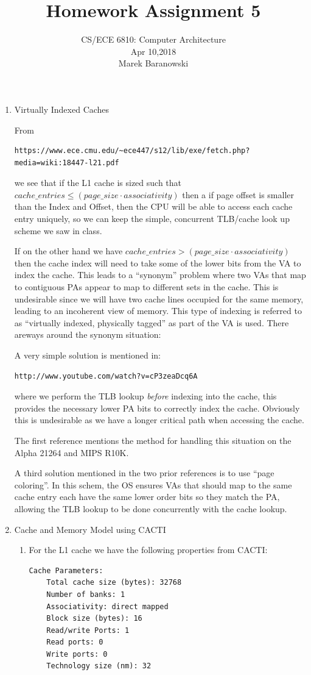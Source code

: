 \documentclass[a4paper, 11pt]{exam}
\title{Homework Assignment 5}
\subtitle{CS/ECE 6810: Computer Architecture \\
Apr 10,2018\\
Marek Baranowski}
\begin{document}
\maketitle
\begin{enumerate}
\item Virtually Indexed Caches

From 
\begin{verbatim}
https://www.ece.cmu.edu/~ece447/s12/lib/exe/fetch.php?media=wiki:18447-l21.pdf
\end{verbatim}
we see that if the L1 cache is sized such that 
$cache\_entries\le(page\_size\cdot associativity)$ then a if page offset is smaller
than the Index and Offset, then the CPU will be able to access each cache
entry uniquely, so we can keep the simple, concurrent TLB/cache look up scheme
we saw in class.

If on the other hand we have $cache\_entries>(page\_size\cdot associativity)$
then the cache index will need to take some of the lower bits from the VA to
index the cache. This leads to a ``synonym'' problem where two VAs that map
to contiguous PAs appear to map to different sets in the cache. This is 
undesirable since we will have two cache lines occupied for the same memory,
leading to an incoherent view of memory. This type of indexing is referred to
as ``virtually indexed, physically tagged'' as part of the VA is used. There 
areways around the synonym situation:

A very simple solution is mentioned in:
\begin{verbatim}http://www.youtube.com/watch?v=cP3zeaDcq6A\end{verbatim}
where we perform the TLB lookup {\em before} indexing into the cache, this
provides the necessary lower PA bits to correctly index the cache. Obviously
this is undesirable as we have a longer critical path when accessing the cache.

The first reference mentions the method for handling this situation on
the Alpha 21264 and MIPS R10K. 


A third solution mentioned in the two prior references is to use ``page
coloring''. In this schem, the OS ensures VAs that should map to the same 
cache entry each have the same lower order bits so they match the PA, allowing 
the TLB lookup to be done concurrently with the cache lookup. 

\item Cache and Memory Model using CACTI

\begin{enumerate}
\item For the L1 cache we have the following properties from CACTI:
\begin{verbatim}
Cache Parameters:
    Total cache size (bytes): 32768
    Number of banks: 1
    Associativity: direct mapped
    Block size (bytes): 16
    Read/write Ports: 1
    Read ports: 0
    Write ports: 0
    Technology size (nm): 32


\end{verbatim}
\end{enumerate}
\end{enumerate}
\end{document}
